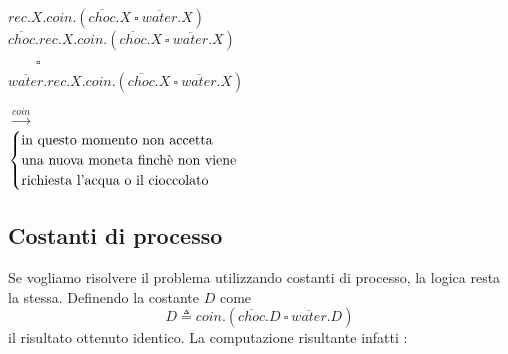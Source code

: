 		\begin{minipage}{0.5\linewidth}
			\vspace{5mm}
			\begin{flushleft}
				$rec.X.coin.(\overline{choc}.X\ \square \ \overline{water}.X)$\\
				\vspace{10 mm}
				$\overline{choc}.rec.X.coin.(\overline{choc}.X\ \square \ \overline{water}.X)$\\
				$\qquad\square$\\
				$\overline{water}.rec.X.coin.(\overline{choc}.X\ \square \ \overline{water}.X)$\\
			\end{flushleft}
		\end{minipage}
		\hfill
		\begin{minipage}{0.4\linewidth}
			\begin{flushright}
				\vspace{5mm}
				$\xrightarrow{coin}$\\
				\vspace{9 mm}
				$\begin{cases}
					\text{in questo momento non accetta}\\
					\text{una nuova moneta finch\`e\ non viene}\\
					\text{richiesta l'acqua o il cioccolato}\\
				\end{cases}$
			\end{flushright}
		\end{minipage}
		
		\subsection{Costanti di processo}
		
		\qquad Se vogliamo risolvere il problema utilizzando costanti di processo, la logica resta la stessa. Definendo la costante $D$ come
		$$D \triangleq coin.(\overline{choc}.D\ \square \ \overline{water}.D)$$ il risultato ottenuto \eacc identico. La computazione risultante infatti \eacc:
		

